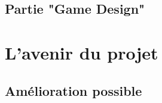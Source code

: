 \documentclass{report}
\begin{document}
\newpage
\chapter{Partie "Game Design"}

\newpage
\part{L'avenir du projet}
\chapter{Amélioration possible}

%
%
\end{document}
